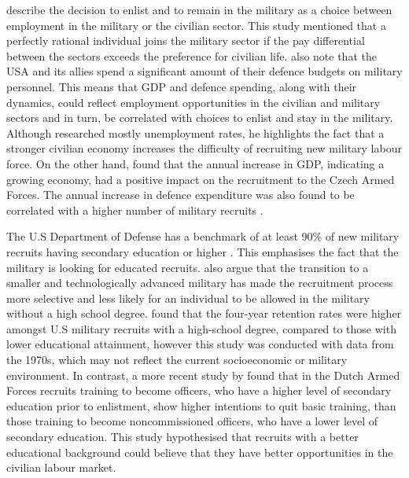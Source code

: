 \textcite{warner_chapter_1995} describe the decision to enlist and to remain in the military
as a choice between employment in the military or the civilian sector. This study 
mentioned that a perfectly rational individual joins the military sector if the pay
differential between the sectors exceeds the preference for civilian life. \textcite{warner_chapter_1995} 
also note that the USA and its allies spend a significant amount of 
their defence budgets on military personnel. This means that GDP and defence spending, 
along with their dynamics, could reflect employment opportunities in the civilian and 
military sectors and in turn, be correlated with choices to enlist and stay in the military.
Although \textcite{backstrom_are_2019} researched mostly unemployment rates, he highlights 
the fact that a stronger civilian economy increases the difficulty of recruiting new military 
labour force. On the other hand, \textcite{holcner_military_2021} found that the annual 
increase in GDP, indicating a growing economy, had a positive impact on the recruitment to the 
Czech Armed Forces. The annual increase in defence expenditure was also found to be 
correlated with a higher number of military recruits \parencite{holcner_military_2021}.

The U.S Department of Defense has a benchmark of at least 90\% of new military recruits 
having secondary education or higher \parencite{cnas_resources_and_force_readiness_division_fiscal_nodate}.
This emphasises the fact that the military is looking for educated recruits. \textcite{asoni_rich_2013} 
also argue that the transition to a smaller and technologically advanced military has 
made the recruitment process more selective and less likely for an individual to 
be allowed in the military without a high school degree. \textcite{elster_study_1982} 
found that the four-year retention rates were higher amongst U.S military recruits 
with a high-school degree, compared to those with lower educational attainment, however 
this study was conducted with data from the 1970s, which may not reflect the current 
socioeconomic or military environment. 
In contrast, a more recent study by \textcite{hof_quality_2023} found that in the 
Dutch Armed Forces recruits training to become officers, who have a higher level of 
secondary education prior to enlistment, show higher intentions to quit basic training, 
than those training to become noncommissioned officers, who have a lower level of 
secondary education. This study hypothesised that recruits with a better educational 
background could believe that they have better opportunities in the civilian labour market.

